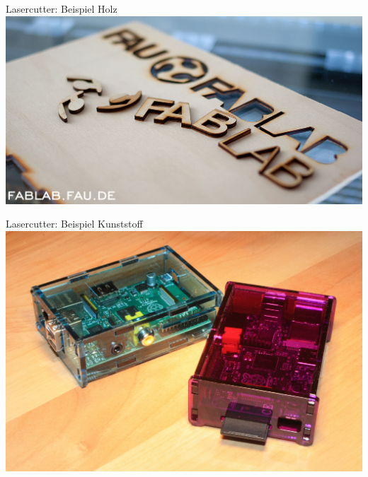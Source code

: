 \documentclass[t]{beamer}
\begin{document}
\begin{frame}{Lasercutter: Beispiel Holz}
    \includegraphics[width=\textwidth]{../img/lasercut-holz.jpg}
\end{frame}
\begin{frame}{Lasercutter: Beispiel Kunststoff}
    \includegraphics[width=\textwidth,clip,trim=0 5cm 0 2cm]{../img/lasercut-kunststoff.jpg}
\end{frame}
\end{document}
